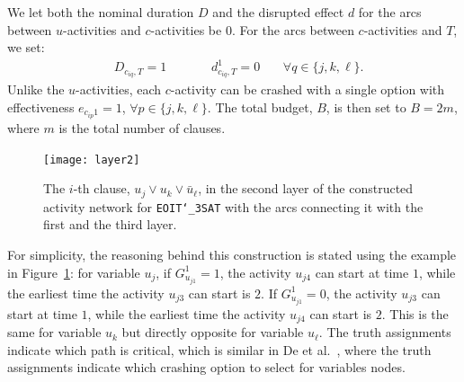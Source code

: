 \documentclass[11pt]{article}
\newcommand{\noi}{\noindent}
\begin{document}
	\newline
	We let both the nominal duration \(D\) and the disrupted effect \(d\) for the arcs between \(u\)-activities and \(c\)-activities be \(0\). For the arcs between \(c\)-activities and \(T\), we set:
	\begin{align*}
		& D_{c_{iq},T} = 1 \qquad \quad \;\; d^1_{c_{iq},T} = 0 \;\;\;\quad \forall q \in \{j,k,\ell\}.
	\end{align*}
	Unlike the \(u\)-activities, each \(c\)-activity can be crashed with a single option with effectiveness \(e_{c_{ip}1} = 1\), \(\forall p \in \{j,k,\ell\}\). The total budget, \(B\), is then set to \(B = 2m\), where \(m\) is the total number of clauses.
	\begin{figure}[H]
		\centering
		\texttt{[image: layer2]}
		\caption{The \(i\)-th clause, \(u_{j} \vee u_{k} \vee \bar{u}_{\ell}\), in the second layer of the constructed activity network for \texttt{EOIT\char`_3SAT} with the arcs connecting it with the first and the third layer.}
		\label{fig:layer2}
	\end{figure}
	\noi For simplicity, the reasoning behind this construction is stated using the example in Figure~\ref{fig:layer2}: for variable \(u_j\), if \(G^1_{u_{j1}} = 1\), the activity \(u_{j4}\) can start at time \(1\), while the earliest time the activity \(u_{j3}\) can start is \(2\). If \(G^1_{u_{j1}} = 0\), the activity \(u_{j3}\) can start at time \(1\), while the earliest time the activity \(u_{j4}\) can start is \(2\). This is the same for variable \(u_k\) but directly opposite for variable \(u_\ell\). The truth assignments indicate which path is critical, which is similar in De et al.~\cite{de1997complexity}, where the truth assignments indicate which crashing option to select for variables nodes. \\
	\newline
\end{document}
